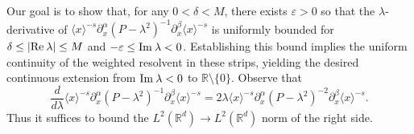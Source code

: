 \documentclass[11pt]{amsart}
\numberwithin{equation}{section}
\def\R{{\mathbb R}}
\def\Re{{\rm Re}\:}
\def\Im{{\rm Im}\:}
\begin{document}
Our goal is to show that, for any $0 < \delta < M$, there exists $\varepsilon > 0$ so that the $\lambda$-derivative of $\langle x \rangle^{-s}  \partial^\alpha_x(P-\lambda^2)^{-1}  \partial^\beta_x \langle x \rangle^{-s}$ is uniformly bounded for $\delta \le |\Re \lambda| \le M$ and $- \varepsilon \le \Im \lambda < 0$. Establishing this bound implies the uniform continuity of the weighted resolvent in these strips, yielding the desired continuous extension from $\Im \lambda < 0$ to $\R \setminus \{0\}$. Observe that 
\begin{equation*}
 \frac{d}{d\lambda}   \langle x \rangle^{-s} \partial^\alpha_x (P - \lambda^2)^{-1}  \partial^\beta_x \langle x \rangle^{-s} = 2\lambda \langle x \rangle^{-s}  \partial^\alpha_x (P - \lambda^2)^{-2}  \partial^\beta_x \langle x \rangle^{-s}. \end{equation*}
Thus it suffices to bound the $L^2(\R^d) \to L^2(\R^d)$ norm of the right side.
\end{document}
